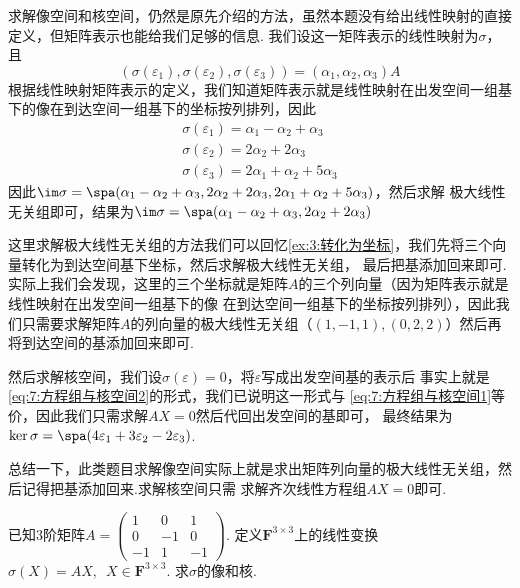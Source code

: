 \begin{solution}
求解像空间和核空间，仍然是原先介绍的方法，虽然本题没有给出线性映射的直接定义，但矩阵表示也能给我们足够的信息.
我们设这一矩阵表示的线性映射为$\sigma$，且
\[(\sigma(\varepsilon_1),\sigma(\varepsilon_2),\sigma(\varepsilon_3))=(\alpha_1,\alpha_2,\alpha_3)A\]
根据线性映射矩阵表示的定义，我们知道矩阵表示就是线性映射在出发空间一组基下的像在到达空间一组基下的坐标按列排列，因此
\begin{gather*}
    \sigma(\varepsilon_1)=\alpha_1-\alpha_2+\alpha_3 \\
    \sigma(\varepsilon_2)=2\alpha_2+2\alpha_3 \\
    \sigma(\varepsilon_3)=2\alpha_1+\alpha_2+5\alpha_3
\end{gather*}
因此$\im\sigma=\spa(\alpha_1-\alpha_2+\alpha_3,2\alpha_2+2\alpha_3,2\alpha_1+\alpha_2+5\alpha_3)$，然后求解
极大线性无关组即可，结果为$\im\sigma=\spa(\alpha_1-\alpha_2+\alpha_3,2\alpha_2+2\alpha_3)$

这里求解极大线性无关组的方法我们可以回忆\autoref{ex:3:转化为坐标}，我们先将三个向量转化为到达空间基下坐标，然后求解极大线性无关组，
最后把基添加回来即可.实际上我们会发现，这里的三个坐标就是矩阵$A$的三个列向量（因为矩阵表示就是线性映射在出发空间一组基下的像
在到达空间一组基下的坐标按列排列），因此我们只需要求解矩阵$A$的列向量的极大线性无关组（$(1,-1,1),(0,2,2)$）然后再将到达空间的基添加回来即可.

然后求解核空间，我们设$\sigma(\varepsilon)=0$，将$\varepsilon$写成出发空间基的表示后
事实上就是\autoref{eq:7:方程组与核空间2}的形式，我们已说明这一形式与
\autoref{eq:7:方程组与核空间1}等价，因此我们只需求解$AX=0$然后代回出发空间的基即可，
最终结果为$\ker\sigma=\spa(4\varepsilon_1+3\varepsilon_2-2\varepsilon_3)$.
\end{solution}

总结一下，此类题目求解像空间实际上就是求出矩阵列向量的极大线性无关组，然后记得把基添加回来.求解核空间只需
求解齐次线性方程组$AX=0$即可.

\begin{example}\label{ex:7:矩阵表示3}
    已知3阶矩阵$A=\begin{pmatrix}
        1 & 0 & 1 \\ 0 & -1 & 0 \\ -1 & 1 & -1
    \end{pmatrix}$. 定义$\mathbf{F}^{3 \times 3}$上的线性变换$\sigma(X)=AX,\enspace X \in \mathbf{F}^{3 \times 3}$.
    求$\sigma$的像和核.
\end{example}
\begin{solution}

\end{solution}

